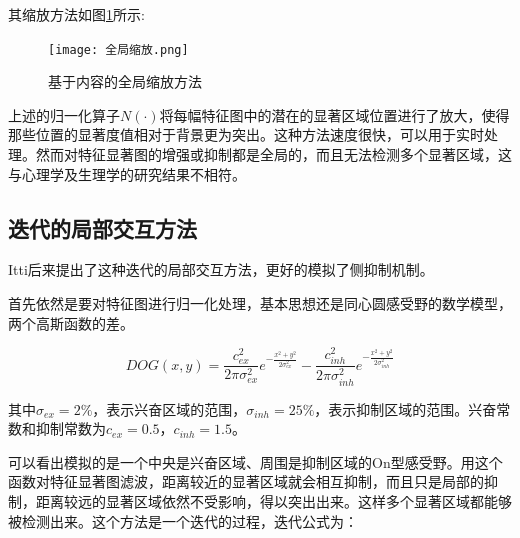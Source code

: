 \documentclass[a4paper,10pt]{article}\large
\begin{document}
其缩放方法如图\ref{fig:9}所示:

\begin{figure}[!htb]
\centering
\texttt{[image: 全局缩放.png]}
\caption{基于内容的全局缩放方法}
\label{fig:9} 
\end{figure}

上述的归一化算子$N(\cdot)$将每幅特征图中的潜在的显著区域位置进行了放大，使得那些位置的显著度值相对于背景更为突出。这种方法速度很快，可以用于实时处理。然而对特征显著图的增强或抑制都是全局的，而且无法检测多个显著区域，这与心理学及生理学的研究结果不相符。

\subsection{迭代的局部交互方法}

Itti后来\cite{3:article}提出了这种迭代的局部交互方法，更好的模拟了侧抑制机制。


首先依然是要对特征图进行归一化处理，基本思想还是同心圆感受野的数学模型，两个高斯函数的差。

\begin{equation}
DOG(x,y)=\frac{c_{ex}^{2}}{2\pi\sigma_{ex}^{2}}e^{-\frac{x^{2}+y^{2}}{2\sigma_{ex}^{2}}}-\frac{c_{inh}^{2}}{2\pi\sigma_{inh}^{2}}e^{-\frac{x^{2}+y^{2}}{2\sigma_{inh}^{2}}}
\end{equation}

其中$\sigma_{ex}=2\%$，表示兴奋区域的范围，$\sigma_{inh}=25\%$，表示抑制区域的范围。兴奋常数和抑制常数为$c_{ex}=0.5$，$c_{inh}=1.5$。


可以看出模拟的是一个中央是兴奋区域、周围是抑制区域的On型感受野。用这个函数对特征显著图滤波，距离较近的显著区域就会相互抑制，而且只是局部的抑制，距离较远的显著区域依然不受影响，得以突出出来。这样多个显著区域都能够被检测出来。这个方法是一个迭代的过程，迭代公式为：
\end{document}
